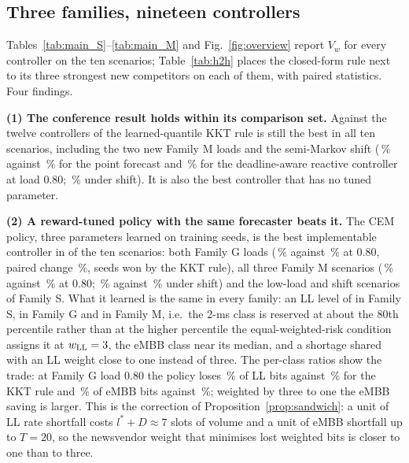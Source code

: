 \documentclass[journal]{IEEEtran}
\begin{document}
\begin{table}[t]
\caption{Forecast quality on validation seeds (deadline-feasible rate normalised by the cell peak; pinball loss averaged over the six levels)}
\label{tab:forecast}
\centering
\scriptsize
\setlength{\tabcolsep}{3pt}
\resizebox{\columnwidth}{!}{}
\end{table}

\subsection{Three families, nineteen controllers}
\label{sec:res_main}
Tables~\ref{tab:main_S}--\ref{tab:main_M} and Fig.~\ref{fig:overview} report $V_w$ for every controller on the ten scenarios; Table~\ref{tab:h2h} places the closed-form rule next to its three strongest new competitors on each of them, with paired statistics. Four findings.

\textbf{(1) The conference result holds within its comparison set.} Against the twelve controllers of \cite{ncc2027} the learned-quantile KKT rule is still the best in all ten scenarios, including the two new Family M loads and the semi-Markov shift (\xmeanmmhighproposed{}\,\% against \xmeanmmhighpointforecast{}\,\% for the point forecast and \xmeanmmhighqueueaware{}\,\% for the deadline-aware reactive controller at load 0.80; \xmeanmmshiftproposed{}\,\% under shift). It is also the best controller that has no tuned parameter.

\textbf{(2) A reward-tuned policy with the same forecaster beats it.} The CEM policy, three parameters learned on training seeds, is the best implementable controller in \xwinscempolicy{} of the ten scenarios: both Family G loads (\xmeantgpphighcempolicy{}\,\% against \xmeantgpphighproposed{}\,\% at 0.80, paired change \xredtgpphighcempolicy{}\,\%, \xredtgpphighcempolicyWins{} seeds won by the KKT rule), all three Family M scenarios (\xmeanmmhighcempolicy{}\,\% against \xmeanmmhighproposed{}\,\% at 0.80; \xmeanmmshiftcempolicy{}\,\% against \xmeanmmshiftproposed{}\,\% under shift) and the low-load and shift scenarios of Family S. What it learned is the same in every family: an LL level of \xcemS{} in Family S, \xcemG{} in Family G and \xcemM{} in Family M, i.e.\ the 2-ms class is reserved at about the 80th percentile rather than at the higher percentile the equal-weighted-risk condition assigns it at $w_{\rm LL} = 3$, the eMBB class near its median, and a shortage shared with an LL weight close to one instead of three. The per-class ratios show the trade: at Family G load 0.80 the policy loses \xmeantgpphighcempolicyLL{}\,\% of LL bits against \xmeantgpphighproposedLL{}\,\% for the KKT rule and \xmeantgpphighcempolicyEMBB{}\,\% of eMBB bits against \xmeantgpphighproposedEMBB{}\,\%; weighted by three to one the eMBB saving is larger. This is the correction of Proposition~\ref{prop:sandwich}: a unit of LL rate shortfall costs $l^\ast + D \approx 7$ slots of volume and a unit of eMBB shortfall up to $T = 20$, so the newsvendor weight that minimises lost weighted bits is closer to one than to three.
\end{document}
